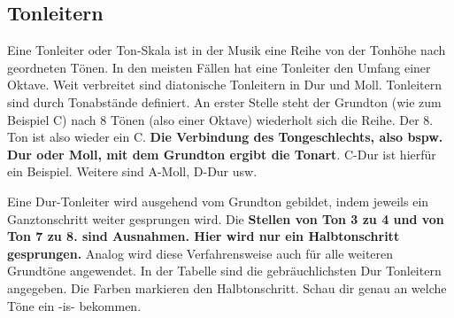 \subsection{Tonleitern}
Eine Tonleiter oder Ton-Skala ist in der Musik eine Reihe von der Tonhöhe nach geordneten Tönen. In den meisten Fällen hat eine Tonleiter den Umfang einer Oktave. Weit verbreitet sind diatonische Tonleitern in Dur und Moll. Tonleitern sind durch Tonabstände definiert. An erster Stelle steht der Grundton (wie zum Beispiel C) nach 8 Tönen (also einer Oktave) wiederholt sich die Reihe. Der 8. Ton ist also wieder ein C. 
\textbf{Die Verbindung des Tongeschlechts, also bspw. Dur oder Moll, mit dem Grundton ergibt die Tonart}. 
C-Dur ist hierfür ein Beispiel. Weitere sind A-Moll, D-Dur usw.

Eine Dur-Tonleiter wird ausgehend vom Grundton gebildet, indem jeweils ein Ganztonschritt weiter 
gesprungen wird. Die \textbf{Stellen von Ton 3 zu 4 und von Ton 7 zu 8. sind Ausnahmen. Hier wird nur ein
Halbtonschritt gesprungen.} Analog wird diese Verfahrensweise auch für alle weiteren Grundtöne angewendet. 
In der Tabelle sind die gebräuchlichsten Dur Tonleitern angegeben. Die Farben markieren den Halbtonschritt. Schau dir genau an welche Töne ein -is- bekommen.

